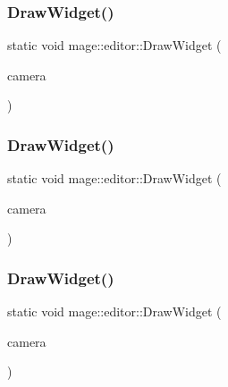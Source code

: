 \hypertarget{namespacemage_1_1editor_a23fa7eda8c2527b241ca0b7f3fc08cad}{}\label{namespacemage_1_1editor_a23fa7eda8c2527b241ca0b7f3fc08cad} 
\subsubsection{\texorpdfstring{Draw\+Widget()}{DrawWidget()}\hspace{0.1cm}{\footnotesize\ttfamily [6/20]}}
{\footnotesize\ttfamily static void mage\+::editor\+::\+Draw\+Widget (\begin{DoxyParamCaption}\item[{\hyperlink{classmage_1_1_camera}{Camera} \&}]{camera }\end{DoxyParamCaption})\hspace{0.3cm}{\ttfamily [static]}}

\hypertarget{namespacemage_1_1editor_a4f5e9b46a25b009d2a4c83d0fbb1eab3}{}\label{namespacemage_1_1editor_a4f5e9b46a25b009d2a4c83d0fbb1eab3} 
\subsubsection{\texorpdfstring{Draw\+Widget()}{DrawWidget()}\hspace{0.1cm}{\footnotesize\ttfamily [7/20]}}
{\footnotesize\ttfamily static void mage\+::editor\+::\+Draw\+Widget (\begin{DoxyParamCaption}\item[{\hyperlink{classmage_1_1_orthographic_camera}{Orthographic\+Camera} \&}]{camera }\end{DoxyParamCaption})\hspace{0.3cm}{\ttfamily [static]}}

\hypertarget{namespacemage_1_1editor_a55d3a481381910efc4ce3ac28fa09c5f}{}\label{namespacemage_1_1editor_a55d3a481381910efc4ce3ac28fa09c5f} 
\subsubsection{\texorpdfstring{Draw\+Widget()}{DrawWidget()}\hspace{0.1cm}{\footnotesize\ttfamily [8/20]}}
{\footnotesize\ttfamily static void mage\+::editor\+::\+Draw\+Widget (\begin{DoxyParamCaption}\item[{\hyperlink{classmage_1_1_perspective_camera}{Perspective\+Camera} \&}]{camera }\end{DoxyParamCaption})\hspace{0.3cm}{\ttfamily [static]}}

